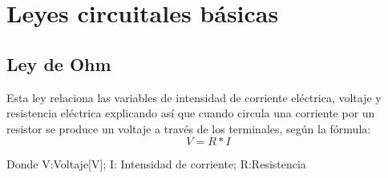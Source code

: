     
    

\section{Leyes circuitales básicas}






\subsection{Ley de Ohm}
Esta ley relaciona las variables de intensidad de corriente eléctrica, voltaje y resistencia eléctrica explicando así que cuando circula una corriente por un resistor se produce un voltaje a  través de los terminales, según la fórmula:\begin {equation*}
        V=R*I
        \label{fig:vir_ohm}
\end {equation*}

        Donde V:Voltaje[V]; I: Intensidad de corriente; R:Resistencia
 
    




